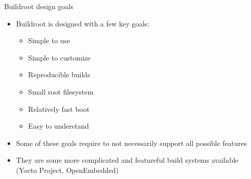 \begin{frame}{Buildroot design goals}
  \begin{itemize}
  \item Buildroot is designed with a few key goals:
    \begin{itemize}
    \item Simple to use
    \item Simple to customize
    \item Reproducible builds
    \item Small root filesystem
    \item Relatively fast boot
    \item Easy to understand
    \end{itemize}
  \item Some of these goals require to not necessarily support all
    possible features
  \item They are some more complicated and featureful build systems
    available (Yocto Project, OpenEmbedded)
  \end{itemize}
\end{frame}

